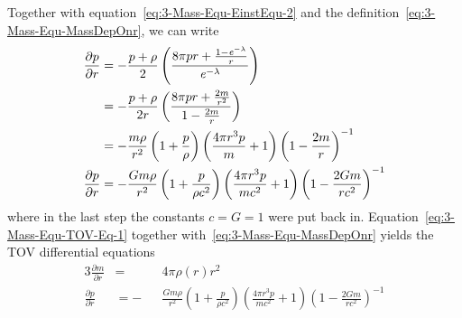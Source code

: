 Together with equation~\eqref{eq:3-Mass-Equ-EinstEqu-2} and the definition~\eqref{eq:3-Mass-Equ-MassDepOnr}, we can write
\begin{align}
	\frac{\partial p}{\partial r} 	&= -\frac{p+\rho}{2}\left(\frac{8\pi pr + \frac{1-\mathit{e}^{-\lambda}}{r}}{\mathit{e}^{-\lambda}} \right)\\
									&= -\frac{p+\rho}{2r}\left(\frac{8\pi pr+ \frac{2m}{r^2}}{1-\frac{2m}{r}} \right)\\
									&= -\frac{m\rho}{r^2}\left(1+\frac{p}{\rho}\right)\left(\frac{4\pi r^3 p}{m}+1\right)\left(1-\frac{2m}{r}\right)^{-1}\\
	\frac{\partial p}{\partial r} 	&= -\frac{Gm\rho}{r^2}\left(1+\frac{p}{\rho c^2}\right)\left(\frac{4\pi r^3 p}{mc^2}+1\right)\left(1-\frac{2Gm}{rc^2}\right)^{-1}
	\label{eq:3-Mass-Equ-TOV-Eq-1}
\end{align}
where in the last step the constants $c=G=1$ were put back in.
Equation~\eqref{eq:3-Mass-Equ-TOV-Eq-1} together with~\eqref{eq:3-Mass-Equ-MassDepOnr} yields the \ac{TOV} differential equations
\begin{alignat}{3}
	\frac{\partial m}{\partial r} &= &&4\pi\rho(r)r^2\\
	\frac{\partial p}{\partial r} &= -&&\frac{Gm\rho}{r^2}\left(1+\frac{p}{\rho c^2}\right)\left(\frac{4\pi r^3 p}{mc^2}+1\right)\left(1-\frac{2Gm}{rc^2}\right)^{-1}
	\label{3-Mass-TOV-Eq}
\end{alignat}
%
%
%
\pagebreak
